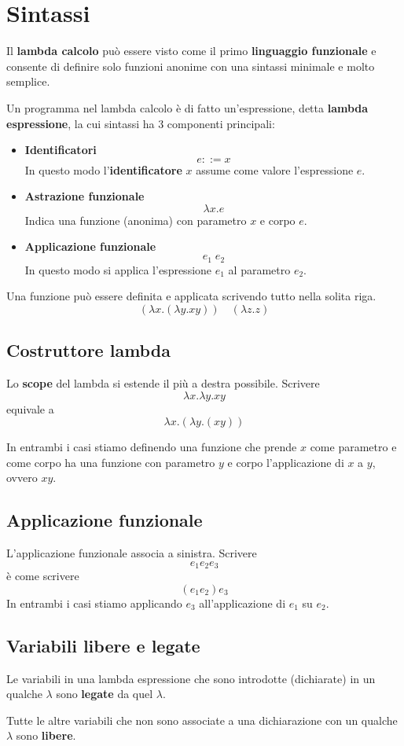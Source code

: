 \section{Sintassi}
Il \textbf{lambda calcolo} può essere visto come il primo \textbf{linguaggio funzionale} e consente di definire solo
funzioni anonime con una sintassi minimale e molto semplice.

Un programma nel lambda calcolo è di fatto un'espressione, detta \textbf{lambda espressione}, la cui sintassi ha 3
componenti principali:
\begin{itemize}
	\item \textbf{Identificatori}
	      \[ e ::= x \]
	      In questo modo l'\textbf{identificatore} $x$ assume come valore l'espressione $e$.
	\item \textbf{Astrazione funzionale}
	      \[ \lambda x.e \]
	      Indica una funzione (anonima) con parametro $x$ e corpo $e$.
	\item \textbf{Applicazione funzionale}
	      \[ e_1 \; e_2 \]
	      In questo modo si applica l'espressione $e_1$ al parametro $e_2$.
\end{itemize}

Una funzione può essere definita e applicata scrivendo tutto nella solita riga.
\[ (\lambda x.(\lambda y.xy)) \quad (\lambda z.z) \]

\subsection{Costruttore lambda}
Lo \textbf{scope} del lambda si estende il più a destra possibile. Scrivere
\[ \lambda x. \lambda y. x y \]
equivale a
\[ \lambda x. (\lambda y. (x y)) \]

In entrambi i casi stiamo definendo una funzione che prende $x$ come parametro e come corpo ha una funzione con
parametro $y$ e corpo l'applicazione di $x$ a $y$, ovvero $xy$.

\subsection{Applicazione funzionale}
L'applicazione funzionale associa a sinistra. Scrivere
\[ e_1 e_2 e_3 \]
è come scrivere
\[ (e_1 e_2) e_3 \]
In entrambi i casi stiamo applicando $e_3$ all'applicazione di $e_1$ su $e_2$.

\subsection{Variabili libere e legate}
Le variabili in una lambda espressione che sono introdotte (dichiarate) in un qualche $\lambda$ sono \textbf{legate}
da quel $\lambda$.

Tutte le altre variabili che non sono associate a una dichiarazione con un qualche $\lambda$ sono \textbf{libere}.